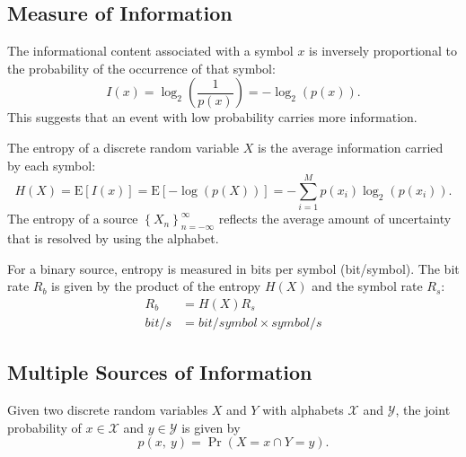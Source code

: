 \documentclass{article}
\begin{document}
\subsection{Measure of Information}
The informational content associated with a symbol \(x\) is inversely
proportional to the probability of the occurrence of that symbol:
\begin{equation*}
    I\left( x \right) = \log_2{\left( \frac{1}{p\left( x \right)} \right)} = -\log_2{\left( p\left( x \right) \right)}.
\end{equation*}
This suggests that an event with low probability carries more information.
\begin{definition}[Entropy]
    The entropy of a discrete random variable \(X\) is the average
    information carried by each symbol:
    \begin{equation*}
        H\left( X \right) = \mathrm{E}\left[ I\left( x \right) \right] = \mathrm{E}\left[ - \log{\left( p\left( X \right) \right)} \right] = -\sum_{i=1}^{M} p\left( x_i \right) \log_2{\left( p\left( x_i \right) \right)}.
    \end{equation*}
    The entropy of a source \(\left\{ X_n \right\}_{n=-\infty}^{\infty}\)
    reflects the average amount of uncertainty that is resolved by using
    the alphabet.
\end{definition}
For a binary source, entropy is measured in bits per symbol (\unit{bit/symbol}).
The bit rate \(R_b\) is given by the product of the entropy
\(H\left( X \right)\) and the symbol rate \(R_s\):
\begin{align*}
    R_b          & = H\left( X \right) R_s                    \\
    \unit{bit/s} & = \unit{bit/symbol} \times \unit{symbol/s}
\end{align*}
\subsection{Multiple Sources of Information}
Given two discrete random variables \(X\) and \(Y\) with alphabets
\(\mathcal{X}\) and \(\mathcal{Y}\), the joint probability of \(x \in
\mathcal{X}\) and \(y \in \mathcal{Y}\) is given by
\begin{equation*}
    p\left( x,\: y \right) = \Pr{\left( X = x \cap Y = y \right)}.
\end{equation*}
\end{document}
